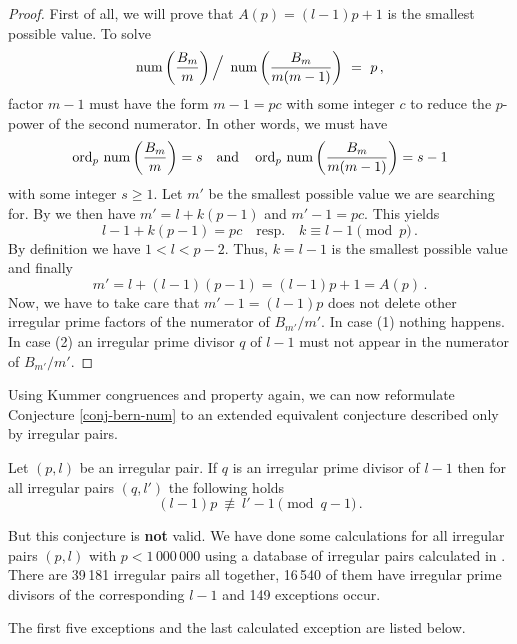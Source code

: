 \documentclass[12pt,english]{article}
\begin{document}
\begin{proof}
First of all, we will prove that $A(p)=(l-1)p+1$ is the smallest possible value.
To solve
\[
    \mathop{\rm num}\nolimits \left( \frac{B_m}{m} \right) \Big/ \
          \mathop{\rm num}\nolimits \left( \frac{B_m}{m(m-1)} \right) \ = \ p \,,
\]
factor $m-1$ must have the form $m-1 = pc$ with some integer $c$ to reduce
the $p$-power of the second numerator. In other words, we must have
\[
    \mathop{\rm ord}\nolimits_p \, \mathop{\rm num}\nolimits \left( \frac{B_m}{m} \right) = s \quad \mbox{and} \quad
      \mathop{\rm ord}\nolimits_p \, \mathop{\rm num}\nolimits \left( \frac{B_m}{m(m-1)} \right) = s-1
\]
with some integer $s \geq 1$.
Let $m'$ be the smallest possible value we are searching for.
By  we then have
$m' = l + k(p-1)$ and $m'-1 = pc$. This yields
\[
   l-1 + k(p-1) = pc  \quad \mbox{resp.} \quad k \equiv l-1 \pmod{p} \,.
\]
By definition we have $1 < l < p-2$. Thus, $k=l-1$ is the smallest possible value and
finally
\[
   m' = l+(l-1)(p-1) = (l-1)p+1 = A(p) \,.
\]
Now, we have to take care that $m'-1=(l-1)p$ does not delete other irregular prime factors
of the numerator of $B_{m'}/m'$. In case (1) nothing happens. In case (2) an
irregular prime divisor $q$ of $l-1$ must not appear in the numerator of $B_{m'}/m'$.
\end{proof}

Using Kummer congruences  and property 
again, we can now reformulate Conjecture \ref{conj-bern-num} to an extended equivalent
conjecture described only by irregular pairs.

\begin{conj}
Let $(p,l)$ be an irregular pair. If $q$ is an irregular prime divisor of $l-1$
then for all irregular pairs $(q,l')$ the following holds
\[
   (l-1)p \ \not\equiv \ l'-1 \pmod{q-1} \,.
\]
\end{conj}

But this conjecture is \textbf{not} valid.
We have done some calculations for all irregular pairs $(p,l)$ with $p < 1\,000\,000$
using a database of irregular pairs calculated in \cite{irrprime12M}. There are
39\,181 irregular pairs all together, 16\,540 of them have irregular prime divisors of
the corresponding $l-1$ and 149 exceptions occur.
\medskip

The first five exceptions and the last calculated exception
are listed below.
\smallskip
\end{document}
